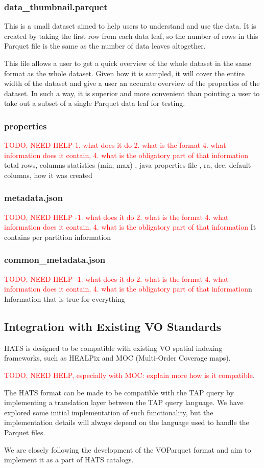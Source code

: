 \documentclass[11pt,a4paper]{ivoa}
\begin{document}
           \subsubsection{data\_thumbnail.parquet} 
  This is a small dataset aimed to help users to understand and use the data. It is created by taking the first row from each data leaf, so the number of rows in this Parquet file is the same as the number of data leaves altogether. \par
  This file allows a user to get a quick overview of the whole dataset in the same format as the whole dataset. Given how it is sampled, it will cover the entire width of the dataset and give a user an accurate overview of the properties of the dataset. In such a way, it is superior and more convenient than pointing a user to take out a subset of a single Parquet data leaf for testing. 
    
        \subsubsection{properties} 
   \textcolor{red}{TODO, NEED HELP-1. what does it do 2. what is the format 4. what information does it contain, 4. what is the obligatory part of that information}
     total rows, columns statistics (min, max) , java properties file , ra, dec, default columns, how it was created 
    
    
        \subsubsection{metadata.json} 
   \textcolor{red}{TODO, NEED HELP -1. what does it do 2. what is the format 4. what information does it contain, 4. what is the obligatory part of that information}
    It contains per partition information
        \subsubsection{common\_metadata.json} 
   \textcolor{red}{TODO, NEED HELP -1. what does it do 2. what is the format 4. what information does it contain, 4. what is the obligatory part of that information}n
    Information that is true for everything 

    \subsection{Integration with Existing VO Standards}
    HATS is designed to be compatible with existing VO spatial indexing frameworks, such as HEALPix and MOC (Multi-Order Coverage maps). \par
   \textcolor{red}{TODO, NEED HELP, especially with MOC: explain more how is it compatible}. \par 
   The HATS format can be made to be compatible with the TAP query by implementing a translation layer between the TAP query language. We have explored some initial implementation of such functionality, but the implementation details will always depend on the language used to handle the Parquet files. \par
  We are closely following the development of the VOParquet format and aim to implement it as a part of HATS catalogs.
\end{document}
